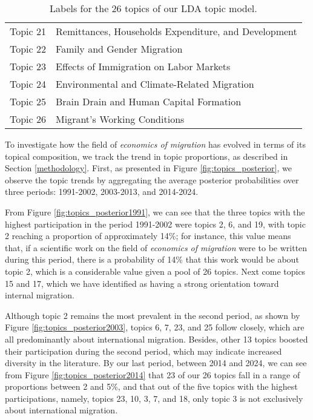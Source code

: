 \begin{table}[ht!]
\begin{tabular}{@{}cl@{}}
Topic 21        & Remittances, Households Expenditure, and Development     \\
Topic 22        & Family and Gender Migration                              \\
Topic 23        & Effects of Immigration on Labor Markets                  \\
Topic 24        & Environmental and Climate-Related Migration              \\
Topic 25        & Brain Drain and Human Capital Formation                  \\
Topic 26        & Migrant's Working Conditions                             \\ \bottomrule
\end{tabular}
\caption{Labels for the 26 topics of our LDA topic model.}
\label{tab:topics_labels}
\end{table}

To investigate how the field of \textit{economics of migration} has evolved in terms of its topical composition, we track the trend in topic proportions, as described in Section \ref{methodology}. First, as presented in Figure \ref{fig:topics_posterior}, we observe the topic trends by aggregating the average posterior probabilities over three periods: 1991-2002, 2003-2013, and 2014-2024. 

From Figure \ref{fig:topics_posterior1991}, we can see that the three topics with the highest participation in the period 1991-2002 were topics 2, 6, and 19, with topic 2 reaching a proportion of approximately 14\%; for instance, this value means that, if a scientific work on the field of \textit{economics of migration} were to be written during this period, there is a probability of 14\% that this work would be about topic 2, which is a considerable value given a pool of 26 topics. Next come topics 15 and 17, which we have identified as having a strong orientation toward internal migration. 

Although topic 2 remains the most prevalent in the second period, as shown by Figure \ref{fig:topics_posterior2003}, topics 6, 7, 23, and 25 follow closely, which are all predominantly about international migration. Besides, other 13 topics boosted their participation during the second period, which may indicate increased diversity in the literature. By our last period, between 2014 and 2024, we can see from Figure \ref{fig:topics_posterior2014} that 23 of our 26 topics fall in a range of proportions between 2 and 5\%, and that out of the five topics with the highest participations, namely, topics 23, 10, 3, 7, and 18, only topic 3 is not exclusively about international migration. 

